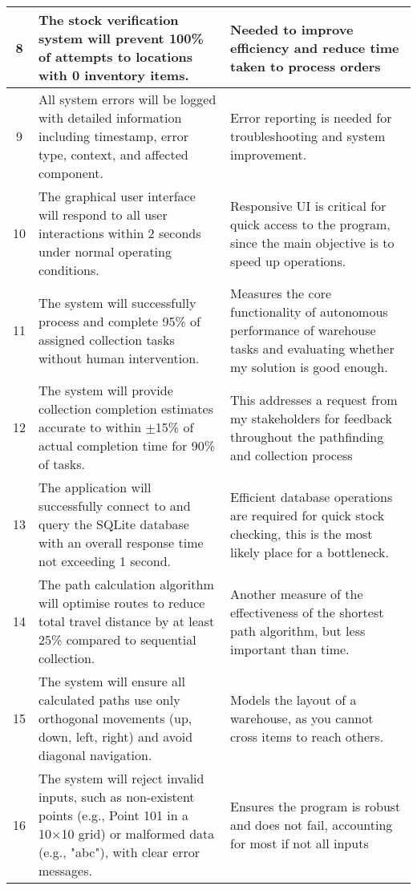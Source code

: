 \begin{table}[htbp!]
\begin{tabularx}{\textwidth}{|c|X|X|}
		\hline
		8 & The stock verification system will prevent 100\% of attempts to locations with 0 inventory items. & Needed to improve efficiency and reduce time taken to process orders \\
		\hline
		9 & All system errors will be logged with detailed information including timestamp, error type, context, and affected component. & Error reporting is needed for troubleshooting and system improvement. \\
		\hline
		10 & The graphical user interface will respond to all user interactions within 2 seconds under normal operating conditions. & Responsive UI is critical for quick access to the program, since the main objective is to speed up operations. \\
		\hline
		11 & The system will successfully process and complete 95\% of assigned collection tasks without human intervention. & Measures the core functionality of autonomous performance of warehouse tasks and evaluating whether my solution is good enough. \\
		\hline
		12 & The system will provide collection completion estimates accurate to within $\pm$15\% of actual completion time for 90\% of tasks. & This addresses a request from my stakeholders for feedback throughout the pathfinding and collection process \\
		\hline
		13 & The application will successfully connect to and query the SQLite database with an overall response time not exceeding 1 second. & Efficient database operations are required for quick stock checking, this is the most likely place for a bottleneck. \\
		\hline
		14 & The path calculation algorithm will optimise routes to reduce total travel distance by at least 25\% compared to sequential collection. & Another measure of the effectiveness of the shortest path algorithm, but less important than time. \\
		\hline
		15 & The system will ensure all calculated paths use only orthogonal movements (up, down, left, right) and avoid diagonal navigation. & Models the layout of a warehouse, as you cannot cross items to reach others. \\
		\hline
		16 & The system will reject invalid inputs, such as non-existent points (e.g., Point 101 in a 10×10 grid) or malformed data (e.g., "abc"), with clear error messages. & Ensures the program is robust and does not fail, accounting for most if not all inputs \\
		\hline
		\end{tabularx}
		\end{table}
